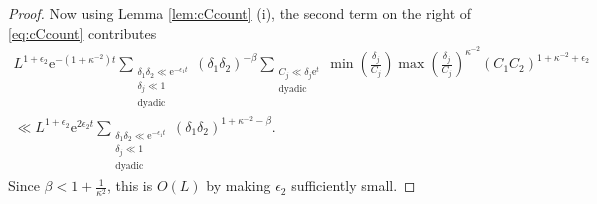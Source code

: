 \documentclass[12pt]{amsart}
\theoremstyle{definition}
\theoremstyle{remark}
\numberwithin{equation}{section}
\newcommand{\e}{\mathrm{e}}
\begin{document}
\begin{proof}
  Now using Lemma \ref{lem:cCcount} (i), the second term on the right of \eqref{eq:cCcount} contributes 
  \begin{multline}
    \label{eq:cCcountsecondterm}
    L^{1 + \epsilon_2 } \e^{-(1 + \kappa^{-2})t} \sum_{\substack{ \delta_1\delta_2 \ll \e^{-\epsilon_1 t} \\ \delta_j \ll 1\\ \mathrm{dyadic}}} (\delta_1 \delta_2)^{- \beta}
  \sum_{\substack{C_j \ll \delta_j \e^t \\\mathrm{dyadic}}} \min(\frac{\delta_j}{C_j}) \max( \frac{\delta_j}{C_j})^{\kappa^{-2}}(C_1C_2)^{1 + \kappa^{-2} + \epsilon_2} \\
    \ll L^{1 + \epsilon_2}\e^{2\epsilon_2 t} \sum_{\substack{ \delta_1\delta_2 \ll \e^{-\epsilon_1 t} \\ \delta_j \ll 1\\ \mathrm{dyadic}}} (\delta_1 \delta_2)^{1 + \kappa^{-2}- \beta}.
  \end{multline}
  Since $\beta < 1 + \tfrac{1}{\kappa^2}$, this is $O(L)$ by making $\epsilon_2$ sufficiently small.  
\end{proof}
\end{document}

